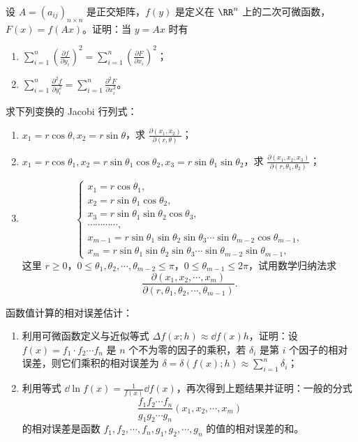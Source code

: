 \begin{xreferenceproblem}[6]
设 $A=(a_{ij})_{n\times n}$ 是正交矩阵，$f(y)$ 是定义在 $\RR^n$ 上的二次可微函数，$F(x)=f(Ax)$。证明：当 $y=Ax$ 时有
  \begin{enumerate}[label=(\arabic*)]
    \item $\sum_{i=1}^n\left(\frac{\partial f}{\partial y_i}\right)^2
      =\sum_{i=1}^n\left(\frac{\partial F}{\partial x_i}\right)^2$；
    \item $\sum_{i=1}^n\frac{\partial^2f}{\partial y_i^2}
      =\sum_{i=1}^n\frac{\partial^2F}{\partial x_i^2}$。
  \end{enumerate}
\end{xreferenceproblem}

\begin{xreferenceproblem}[7]
求下列变换的 Jacobi 行列式：
  \begin{enumerate}[label=(\arabic*)]
    \item $x_1=r\cos\theta,x_2=r\sin\theta$，求 $\frac{\partial(x_1,x_2)}{\partial(r,\theta)}$；
    \item $x_1=r\cos\theta_1,x_2=r\sin\theta_1\cos\theta_2,x_3=r\sin\theta_1\sin\theta_2$，求 $\frac{\partial(x_1,x_2,x_3)}{\partial(r,\theta_1,\theta_2)}$；
    \item
    \[
      \begin{cases}
        x_1=r\cos\theta_1,\\
        x_2=r\sin\theta_1\cos\theta_2,\\
        x_3=r\sin\theta_1\sin\theta_2\cos\theta_3,\\
        \cdots\cdots\cdots\cdots,\\
        x_{m-1}=r\sin\theta_1\sin\theta_2\sin\theta_3\cdots\sin\theta_{m-2}\cos\theta_{m-1},\\
        x_m=r\sin\theta_1\sin\theta_2\sin\theta_3\cdots\sin\theta_{m-2}\sin\theta_{m-1},
      \end{cases}
    \]
    这里 $r\ge0$，$0\le\theta_1,\theta_2,\cdots,\theta_{m-2}\le\pi$，$0\le\theta_{m-1}\le2\pi$，试用数学归纳法求
    \[
      \frac{\partial(x_1,x_2,\cdots,x_m)}{\partial(r,\theta_1,\theta_2,\cdots,\theta_{m-1})}.
    \]
  \end{enumerate}
\end{xreferenceproblem}

\begin{xreferenceproblem}[8]
函数值计算的相对误差估计：
  \begin{enumerate}[label=(\arabic*)]
    \item 利用可微函数定义与近似等式 $\Delta f(x;h)\approx\dd f(x)h$，证明：设 $f(x)=f_1\cdot f_2\cdots f_n$ 是 $n$ 个不为零的因子的乘积，若 $\delta_i$ 是第 $i$ 个因子的相对误差，则它们乘积的相对误差为 $\delta=\delta(f(x);h)\approx\sum_{i=1}^n\delta_i$；
    \item 利用等式 $\dd\ln f(x)=\frac1{f(x)}\dd f(x)$，再次得到上题结果并证明：一般的分式
    \[
      \frac{f_1f_2\cdots f_n}{g_1g_2\cdots g_n}(x_1,x_2,\cdots,x_m)
    \]
    的相对误差是函数 $f_1,f_2,\cdots,f_n,g_1,g_2,\cdots,g_n$ 的值的相对误差的和。
  \end{enumerate}
\end{xreferenceproblem}

